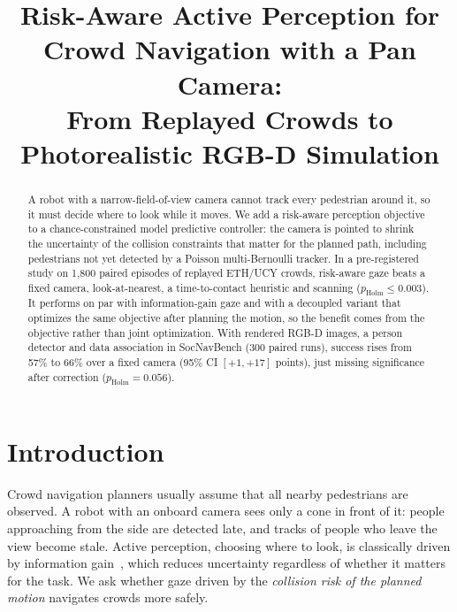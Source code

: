 \documentclass[conference]{IEEEtran}
\begin{document}
\title{Risk-Aware Active Perception for Crowd Navigation with a Pan Camera:\\
From Replayed Crowds to Photorealistic RGB-D Simulation}

\author{
}

\maketitle

\begin{abstract}
A robot with a narrow-field-of-view camera cannot track every pedestrian around it, so it must decide where to look while it moves. We add a risk-aware perception objective to a chance-constrained model predictive controller: the camera is pointed to shrink the uncertainty of the collision constraints that matter for the planned path, including pedestrians not yet detected by a Poisson multi-Bernoulli tracker. In a pre-registered study on 1,800 paired episodes of replayed ETH/UCY crowds, risk-aware gaze beats a fixed camera, look-at-nearest, a time-to-contact heuristic and scanning ($p_\text{Holm}\le0.003$). It performs on par with information-gain gaze and with a decoupled variant that optimizes the same objective after planning the motion, so the benefit comes from the objective rather than joint optimization. With rendered RGB-D images, a person detector and data association in SocNavBench (300 paired runs), success rises from 57\% to 66\% over a fixed camera (95\% CI $[+1, +17]$ points), just missing significance after correction ($p_\text{Holm}=0.056$).
\end{abstract}

\section{Introduction}
Crowd navigation planners usually assume that all nearby pedestrians are observed. A robot with an onboard camera sees only a cone in front of it: people approaching from the side are detected late, and tracks of people who leave the view become stale. Active perception, choosing where to look, is classically driven by information gain~\cite{bajcsy1988}, which reduces uncertainty regardless of whether it matters for the task. We ask whether gaze driven by the \emph{collision risk of the planned motion} navigates crowds more safely.
\end{document}
